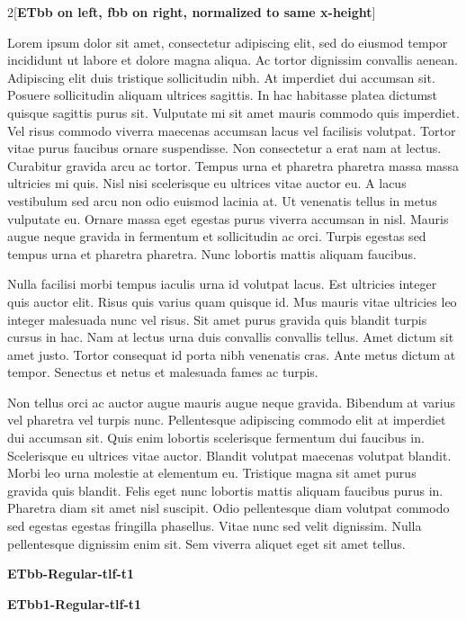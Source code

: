 \documentclass[11pt]{article}
\begin{document}
\begin{multicols}{2}[\textbf{ETbb on left, fbb on right, normalized to same x-height}]
\columnbreak
{Lorem ipsum dolor sit amet, consectetur adipiscing elit, sed do eiusmod tempor incididunt ut labore et dolore magna aliqua. Ac tortor dignissim convallis aenean. Adipiscing elit duis tristique sollicitudin nibh. At imperdiet dui accumsan sit. Posuere sollicitudin aliquam ultrices sagittis. In hac habitasse platea dictumst quisque sagittis purus sit. Vulputate mi sit amet mauris commodo quis imperdiet. Vel risus commodo viverra maecenas accumsan lacus vel facilisis volutpat. Tortor vitae purus faucibus ornare suspendisse. Non consectetur a erat nam at lectus. Curabitur gravida arcu ac tortor. Tempus urna et pharetra pharetra massa massa ultricies mi quis. Nisl nisi scelerisque eu ultrices vitae auctor eu. A lacus vestibulum sed arcu non odio euismod lacinia at. Ut venenatis tellus in metus vulputate eu. Ornare massa eget egestas purus viverra accumsan in nisl. Mauris augue neque gravida in fermentum et sollicitudin ac orci. Turpis egestas sed tempus urna et pharetra pharetra. Nunc lobortis mattis aliquam faucibus.

Nulla facilisi morbi tempus iaculis urna id volutpat lacus. Est ultricies integer quis auctor elit. Risus quis varius quam quisque id. Mus mauris vitae ultricies leo integer malesuada nunc vel risus. Sit amet purus gravida quis blandit turpis cursus in hac. Nam at lectus urna duis convallis convallis tellus. Amet dictum sit amet justo. Tortor consequat id porta nibh venenatis cras. Ante metus dictum at tempor. Senectus et netus et malesuada fames ac turpis.

Non tellus orci ac auctor augue mauris augue neque gravida. Bibendum at varius vel pharetra vel turpis nunc. Pellentesque adipiscing commodo elit at imperdiet dui accumsan sit. Quis enim lobortis scelerisque fermentum dui faucibus in. Scelerisque eu ultrices vitae auctor. Blandit volutpat maecenas volutpat blandit. Morbi leo urna molestie at elementum eu. Tristique magna sit amet purus gravida quis blandit. Felis eget nunc lobortis mattis aliquam faucibus purus in. Pharetra diam sit amet nisl suscipit. Odio pellentesque diam volutpat commodo sed egestas egestas fringilla phasellus. Vitae nunc sed velit dignissim. Nulla pellentesque dignissim enim sit. Sem viverra aliquet eget sit amet tellus.
}
\end{multicols}

\textbf{ETbb-Regular-tlf-t1}

\newpage
\textbf{ETbb1-Regular-tlf-t1}
\end{document}
